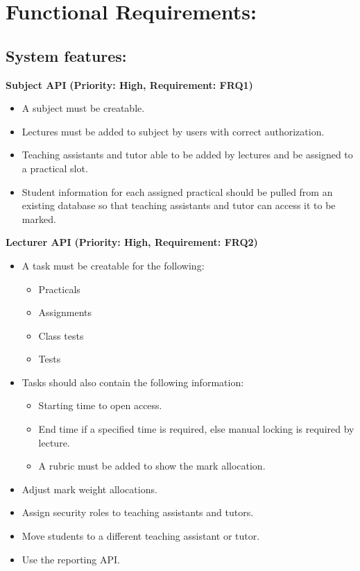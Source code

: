 \documentclass[12pt]{article}
\begin{document}
	\vspace{0.5in}
	
	\newpage
	\section{Functional Requirements:}
	\vspace{0.2in}
		
		\subsection{System features:} %
		\vspace{0.15in}
		
		\hspace{0.2in}\textbf{Subject API}
		\newline\textbf{(Priority: High, Requirement: FRQ1)}
		\begin{itemize}
			\item A subject must be creatable.
			\item Lectures must be added to subject by users with correct authorization.
			\item Teaching assistants and tutor able to be added by lectures and be assigned to a practical slot.
			\item Student information for each assigned practical should be pulled from an existing database so that
					teaching assistants and tutor can access it to be marked.
		\end{itemize}
		
		\vspace{0.15in}
		
		\textbf{Lecturer API}
		\textbf{(Priority: High, Requirement: FRQ2)}
		\begin{itemize}
			\item A task must be creatable for the following:
					\begin{itemize}
						\item Practicals
						\item Assignments
						\item Class tests
						\item Tests
					\end{itemize}
			\item Tasks should also contain the following information:
					\begin{itemize}
						\item Starting time to open access.
						\item End time if a specified time is required, else manual locking is required by lecture.
						\item A rubric must be added to show the mark allocation.
					\end{itemize}
			\item Adjust mark weight allocations.
			\item Assign security roles to teaching assistants and tutors.
			\item Move students to a different teaching assistant or tutor.
			\item Use the reporting API.
		\end{itemize}
		
\end{document}
